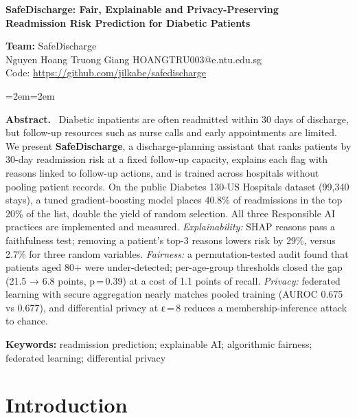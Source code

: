 \documentclass[10pt,a4paper]{article}
\renewenvironment{abstract}{\begin{list}{}{\leftmargin=2em\rightmargin=2em\topsep=0pt}\item\relax\textbf{Abstract.}\ }{\end{list}}
\begin{document}
\begin{center}
{\fontsize{15}{18.5}\selectfont\bfseries{}
SafeDischarge: Fair, Explainable and Privacy-Preserving\\Readmission Risk Prediction for Diabetic Patients\par}
\vspace{8pt}
\textbf{Team:} SafeDischarge\\[2pt]
Nguyen Hoang Truong Giang \textperiodcentered{} HOANGTRU003@e.ntu.edu.sg\\[2pt]
Code: \url{https://github.com/jilkabe/safedischarge}
\end{center}

\vspace{2pt}
\begin{abstract}
Diabetic inpatients are often readmitted within 30 days of discharge, but follow-up resources such as nurse calls and early appointments are limited. We present \textbf{SafeDischarge}, a discharge-planning assistant that ranks patients by 30-day readmission risk at a fixed follow-up capacity, explains each flag with reasons linked to follow-up actions, and is trained across hospitals without pooling patient records. On the public Diabetes 130-US Hospitals dataset (99,340 stays), a tuned gradient-boosting model places 40.8\% of readmissions in the top 20\% of the list, double the yield of random selection. All three Responsible AI practices are implemented and measured. \emph{Explainability:} SHAP reasons pass a faithfulness test; removing a patient's top-3 reasons lowers risk by 29\%, versus 2.7\% for three random variables. \emph{Fairness:} a permutation-tested audit found that patients aged 80+ were under-detected; per-age-group thresholds closed the gap (21.5 → 6.8 points, p\,=\,0.39) at a cost of 1.1 points of recall. \emph{Privacy:} federated learning with secure aggregation nearly matches pooled training (AUROC 0.675 vs 0.677), and differential privacy at ε\,=\,8 reduces a membership-inference attack to chance.

\vspace{3pt}\noindent\textbf{Keywords:} readmission prediction; explainable AI; algorithmic fairness; federated learning; differential privacy
\end{abstract}

\section{Introduction}\label{sec:1}
\end{document}
